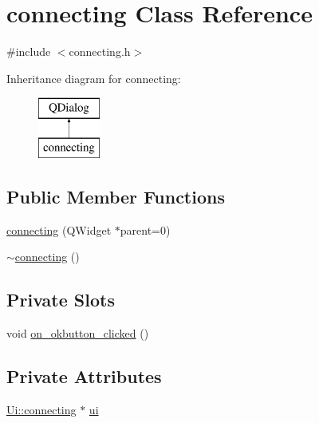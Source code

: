 \hypertarget{classconnecting}{\section{connecting Class Reference}
\label{classconnecting}
}


{\ttfamily \#include $<$connecting.\-h$>$}

Inheritance diagram for connecting\-:\begin{figure}[H]
\begin{center}
\leavevmode
\includegraphics[height=2.000000cm]{classconnecting}
\end{center}
\end{figure}
\subsection*{Public Member Functions}
\begin{DoxyCompactItemize}
\item 
\hyperlink{classconnecting_a06853b4d660c9eee99074dc63667355c}{connecting} (Q\-Widget $\ast$parent=0)
\item 
\hyperlink{classconnecting_a4532e717edfa28fc7e18bc3fd455bf93}{$\sim$connecting} ()
\end{DoxyCompactItemize}
\subsection*{Private Slots}
\begin{DoxyCompactItemize}
\item 
void \hyperlink{classconnecting_a4a5994796b15dc10c9a43a87b2ea91f1}{on\-\_\-okbutton\-\_\-clicked} ()
\end{DoxyCompactItemize}
\subsection*{Private Attributes}
\begin{DoxyCompactItemize}
\item 
\hyperlink{classUi_1_1connecting}{Ui\-::connecting} $\ast$ \hyperlink{classconnecting_a459b5a1f88bd6c43d03d6968313f8016}{ui}
\end{DoxyCompactItemize}


